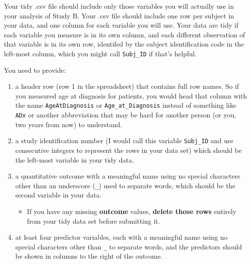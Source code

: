 \documentclass[]{book}
\providecommand{\tightlist}{%
  \setlength{\itemsep}{0pt}\setlength{\parskip}{0pt}}
\begin{document}
Your tidy .csv file should include only those variables you will actually use in your analysis of Study B. Your .csv file should include one row per subject in your data, and one column for each variable you will use. Your data are tidy if each variable you measure is in its own column, and each different observation of that variable is in its own row, identifed by the subject identification code in the left-most column, which you might call \texttt{Subj\_ID} if that's helpful.

You need to provide:

\begin{enumerate}
\def\labelenumi{\arabic{enumi}.}
\tightlist
\item
  a header row (row 1 in the spreadsheet) that contains full row names. So if you measured age at diagnosis for patients, you would head that column with the name \texttt{AgeAtDiagnosis} or \texttt{Age\_at\_Diagnosis} instead of something like \texttt{ADx} or another abbreviation that may be hard for another person (or you, two years from now) to understand.
\item
  a study identification number (I would call this variable \texttt{Subj\_ID} and use consecutive integers to represent the rows in your data set) which should be the left-most variable in your tidy data.
\item
  a quantitative outcome with a meaningful name using no special characters other than an underscore (\texttt{\_}) used to separate words, which should be the second variable in your data.

  \begin{itemize}
  \tightlist
  \item
    If you have any missing \textbf{outcome} values, \textbf{delete those rows} entirely from your tidy data set before submitting it.
  \end{itemize}
\item
  at least four predictor variables, each with a meaningful name using no special characters other than \texttt{\_} to separate words, and the predictors should be shown in columns to the right of the outcome.


\end{enumerate}
\end{document}
